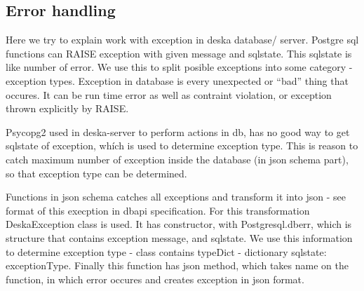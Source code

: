 \documentclass[deska]{subfiles}
\begin{document}
\subsection{Error handling}
Here we try to explain work with exception in deska database/ server. Postgre sql functions can RAISE exception with given message and sqlstate.
This sqlstate is like number of error. We use this to split posible exceptions into some category - exception types. Exception in database is
every unexpected or “bad” thing that occures. It can be run time error as well as contraint violation, or exception thrown explicitly by RAISE.

Psycopg2 used in deska-server to perform actions in db, has no good way to get sqlstate of exception, whích is used to determine exception type.
This is reason to catch maximum number of exception inside the database (in json schema part), so that exception type can be determined.

Functions in json schema catches all exceptions and transform it into json - see format of this execption in dbapi specification.
For this transformation DeskaException class is used. It has constructor, with Postgresql.dberr, which is structure that contains exception
message, and sqlstate. We use this information to determine exception type - class contains typeDict - dictionary {sqlstate: exceptionType}.
Finally this function has json method, which takes name on the function, in which error occures and creates exception in json format.
\end{document}
